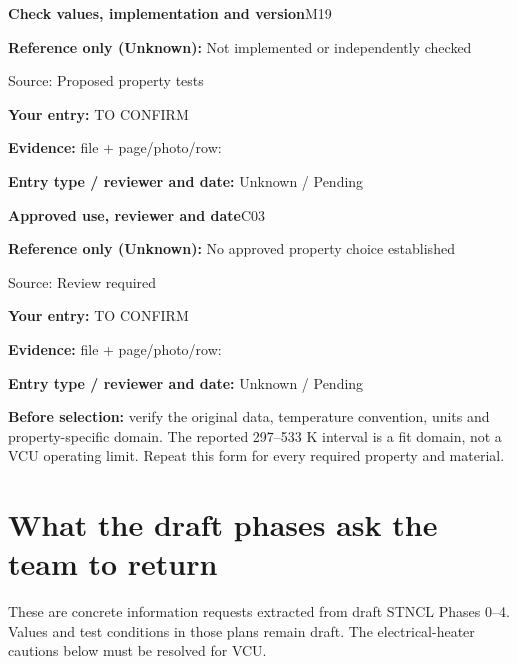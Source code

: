 \documentclass[11pt]{article}
\newcommand{\notebox}[1]{\par\noindent\colorbox{amber}{\parbox{\dimexpr\linewidth-2\fboxsep\relax}{#1}}\par}
\begin{document}
\par\noindent\begin{minipage}{\textwidth}\small
{\color{navy}\bfseries Check values, implementation and version}\hfill M19\par
\colorbox{pale}{\parbox{\dimexpr\linewidth-2\fboxsep\relax}{
\textbf{Reference only (Unknown):} Not implemented or independently checked\par
{\footnotesize Source: Proposed property tests}}}\par
\textbf{Your entry:} {\color{muted}TO CONFIRM}\enspace\hrulefill\par
{\footnotesize\textbf{Evidence:} file + page/photo/row: \hrulefill\par
\textbf{Entry type / reviewer and date:} Unknown / Pending\par
}\end{minipage}\par\vspace{5pt}
\par\noindent\begin{minipage}{\textwidth}\small
{\color{navy}\bfseries Approved use, reviewer and date}\hfill C03\par
\colorbox{pale}{\parbox{\dimexpr\linewidth-2\fboxsep\relax}{
\textbf{Reference only (Unknown):} No approved property choice established\par
{\footnotesize Source: Review required}}}\par
\textbf{Your entry:} {\color{muted}TO CONFIRM}\enspace\hrulefill\par
{\footnotesize\textbf{Evidence:} file + page/photo/row: \hrulefill\par
\textbf{Entry type / reviewer and date:} Unknown / Pending\par
}\end{minipage}\par\vspace{5pt}
\notebox{\textbf{Before selection:} verify the original data, temperature convention, units and property-specific domain. The reported 297--533 K interval is a fit domain, not a VCU operating limit. Repeat this form for every required property and material.}
\clearpage\section{What the draft phases ask the team to return}\label{phase-requests}
These are concrete information requests extracted from draft STNCL Phases 0--4. Values and test conditions in those plans remain draft. The electrical-heater cautions below must be resolved for VCU.
\end{document}
